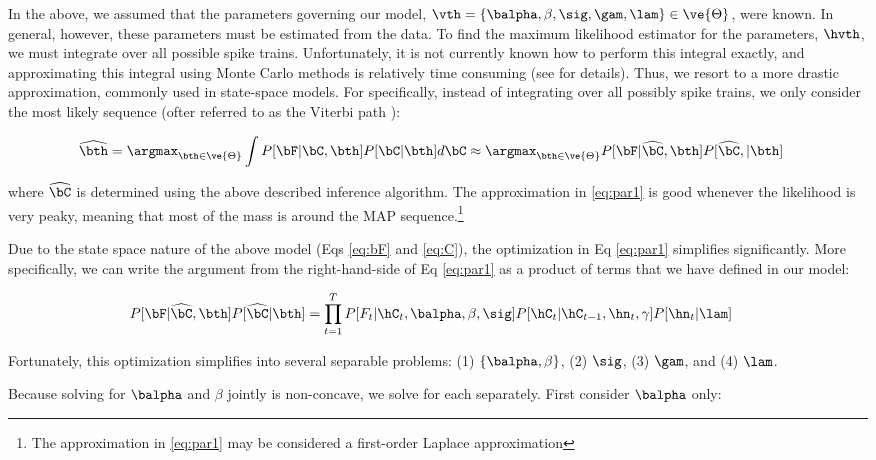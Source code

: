 In the above, we assumed that the parameters governing our model, $\vth=\{\balpha, \beta, \sig, \gam, \lam\} \in \ve{\Theta}$, were known. In general, however, these parameters must be estimated from the data. To find the maximum likelihood estimator for the parameters, $\hvth$, we must integrate over all possible spike trains. Unfortunately, it is not currently known how to perform this integral exactly, and approximating this integral using Monte Carlo methods is relatively time consuming (see \cite{VogelsteinPaninski09b} for details).  Thus, we resort to a more drastic approximation, commonly used in state-space models.  For specifically, instead of integrating over all possibly spike trains, we only consider the most likely sequence (ofter referred to as the Viterbi path \cite{Rabiner89}): 

\begin{align} \label{eq:par1}
\widehat{\bth} &= \argmax_{\bth \in \ve{\Theta}} \int P[\bF|\bC, \bth] P[\bC | \bth]  d\bC  \approx \argmax_{\bth \in \ve{\Theta}}P[\bF| \hCm, \bth] P[\hCm, | \bth]
\end{align}

\noindent where $\hCm$ is determined using the above described inference algorithm. The approximation in \eqref{eq:par1} is good whenever the likelihood is very peaky, meaning that most of the mass is around the MAP sequence.\footnote{The approximation in \eqref{eq:par1} may be considered a first-order Laplace approximation}  

Due to the state space nature of the above model (Eqs \eqref{eq:bF} and \eqref{eq:C}), the optimization in Eq \eqref{eq:par1} simplifies significantly.  More specifically, we can write the argument from the right-hand-side of Eq \eqref{eq:par1} as a product of terms that we have defined in our model:

 \begin{align} \label{eq:par2}
P[\bF| \hCm, \bth] P[\hCm | \bth] &= \prod_{t=1}^T P[F_t | \hC_t, \balpha, \beta,\sig] P[\hC_t | \hC_{t-1}, \hn_t, \gamma] P[\hn_t | \lam]
\end{align}

\noindent Fortunately, this optimization simplifies into several separable problems: (1) $\{\balpha, \beta\}$, (2) $\sig$, (3) $\gam$, and (4) $\lam$.  

Because solving for $\balpha$ and $\beta$ jointly is non-concave, we solve for each separately.  First consider $\balpha$ only:

